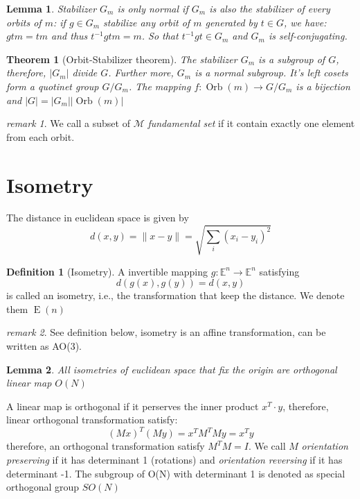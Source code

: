 \documentclass{amsart}
\newcommand{\setM}{\mathcal{M}}
\newtheorem*{theorem}{Theorem}
\newtheorem*{lemma}{Lemma}
\theoremstyle{remark}
\newtheorem*{remark}{remark}
\theoremstyle{remark}
\theoremstyle{definition}
\newtheorem*{definition}{Definition}
\DeclareMathOperator{\E}{E}
\DeclareMathOperator{\Orb}{Orb}
\begin{document}
\begin{lemma}
    Stabilizer $G_m$ is only normal if $G_m$ is also the stabilizer of every orbits of $m$: 
    if $g\in G_m$ stabilize any orbit of $m$ generated by $t\in G$, 
    we have: $gtm = tm$ and thus $t^{-1}gtm = m$. So that $t^{-1}gt \in G_m$ and $G_m$ is self-conjugating. 
\end{lemma}

\begin{theorem}
    [Orbit-Stabilizer theorem]
    The stabilizer $G_m$ is a subgroup of $G$, therefore, $|G_m|$ divide $G$. 
    Further more, $G_m$ is a normal subgroup. It's left cosets form a quotinet group $G/G_m$. 
    The mapping $f\colon \Orb(m) \to G/G_m$ is a bijection and $|G|=|G_m||\Orb(m)|$
\end{theorem}
\begin{remark}
    We call a
    subset of $\setM$ \emph{fundamental set} if it contain exactly one element from each orbit.
\end{remark}

\vspace{10pt}
\section*{Isometry}
The distance in euclidean space is given by 
\[
    d(x,y) = \|x-y\| = \sqrt{\sum_i(x_i-y_i)^2}    
\]

\begin{definition}
    [Isometry]
    A invertible mapping $g\colon \mathbb{E}^n \to \mathbb{E}^n$ satisfying 
    \begin{equation*}
        d(g(x),g(y)) = d(x,y)
    \end{equation*}    
    is called an isometry, i.e., the transformation that keep the distance. 
    We denote them $\E(n)$
\end{definition}
\begin{remark}
    See definition below, isometry is an affine transformation, can be written as AO(3).
\end{remark}

\begin{lemma}
All isometries of euclidean space that fix the origin are orthogonal linear map $O(N)$
\end{lemma}
A linear map is orthogonal if it perserves the inner product $x^T\cdot y$, therefore, linear 
orthogonal transformation satisfy:
\begin{equation*}
    (Mx)^T(My) = x^T M^{T}My = x^T y
\end{equation*}
therefore, an orthogonal transformation satisfy $M^{T}M = I$. 
We call $M$ \emph{orientation preserving} if it has determinant 1 (rotations) and 
\emph{orientation reversing} if it has determinant -1. The subgroup of O(N) with 
determinant 1 is denoted as special orthogonal group $SO(N)$
\end{document}
